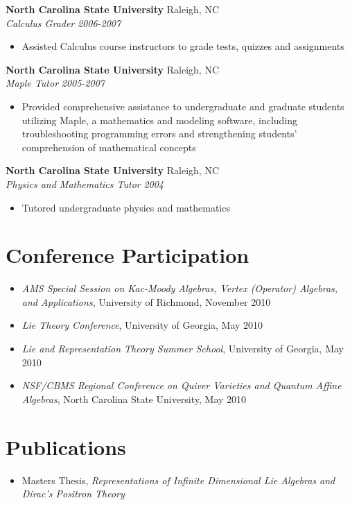 \documentclass[10pt]{article}
\begin{document}
\noindent
{\bf North Carolina State University} \hfill Raleigh, NC\\
{\it Calculus Grader} \hfill {\it 2006-2007}

\begin{itemize}

\item Assisted Calculus course instructors to grade tests, quizzes and
assignments

\end{itemize}


\noindent
{\bf North Carolina State University} \hfill Raleigh, NC\\
{\it Maple Tutor} \hfill {\it 2005-2007}

\begin{itemize}

\item	Provided comprehensive assistance to undergraduate and graduate
students utilizing Maple, a mathematics and modeling software, including
troubleshooting programming errors and strengthening students’ comprehension
of mathematical concepts

\end{itemize}


\noindent
{\bf North Carolina State University} \hfill Raleigh, NC\\
{\it Physics and Mathematics Tutor} \hfill {\it 2004}

\begin{itemize}

\item	Tutored undergraduate physics and mathematics

\end{itemize}


\section*{Conference Participation}

\begin{itemize}

\item	{\it AMS Special Session on Kac-Moody Algebras, Vertex (Operator)
Algebras, and Applications}, University of Richmond, November 2010

\item	{\it Lie Theory Conference}, University of Georgia, May 2010

\item	{\it Lie and Representation Theory Summer School}, University of Georgia,
May 2010

\item	{\it NSF/CBMS Regional Conference on Quiver Varieties and Quantum Affine
Algebras}, North Carolina State University, May 2010

\end{itemize}


\section*{Publications}

\begin{itemize}

\item Masters Thesis, {\it Representations of Infinite Dimensional Lie Algebras
and Dirac's Positron Theory}

\end{itemize}
\end{document}
